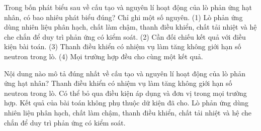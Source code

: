\begin{ex}
Trong bốn phát biểu sau về cấu tạo và nguyên lí hoạt động của lò phản ứng hạt nhân, có bao nhiêu phát biểu đúng? Chỉ ghi một số nguyên. (1) Lò phản ứng dùng nhiên liệu phân hạch, chất làm chậm, thanh điều khiển, chất tải nhiệt và hệ che chắn để duy trì phản ứng có kiểm soát. (2) Cần đối chiếu kết quả với điều kiện bài toán. (3) Thanh điều khiển có nhiệm vụ làm tăng không giới hạn số neutron trong lò. (4) Mọi trường hợp đều cho cùng một kết quả.
\end{ex}

\begin{ex}
Nội dung nào mô tả đúng nhất về cấu tạo và nguyên lí hoạt động của lò phản ứng hạt nhân?
\choice
{Thanh điều khiển có nhiệm vụ làm tăng không giới hạn số neutron trong lò.}
{Có thể bỏ qua điều kiện áp dụng và đơn vị trong mọi trường hợp.}
{Kết quả của bài toán không phụ thuộc dữ kiện đã cho.}
{\True Lò phản ứng dùng nhiên liệu phân hạch, chất làm chậm, thanh điều khiển, chất tải nhiệt và hệ che chắn để duy trì phản ứng có kiểm soát.}
\end{ex}

